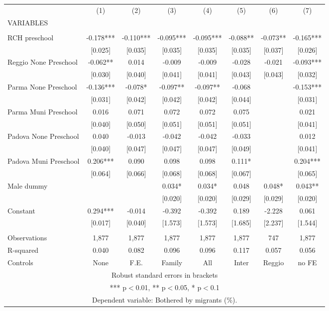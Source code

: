 \begin{tabular}{lccccccc} \hline
 & (1) & (2) & (3) & (4) & (5) & (6) & (7) \\
VARIABLES &  &  &  &  &  &  &  \\ \hline
 &  &  &  &  &  &  &  \\
RCH preschool & -0.178*** & -0.110*** & -0.095*** & -0.095*** & -0.088** & -0.073** & -0.165*** \\
 & [0.025] & [0.035] & [0.035] & [0.035] & [0.035] & [0.037] & [0.026] \\
Reggio None Preschool & -0.062** & 0.014 & -0.009 & -0.009 & -0.028 & -0.021 & -0.093*** \\
 & [0.030] & [0.040] & [0.041] & [0.041] & [0.043] & [0.043] & [0.032] \\
Parma None Preschool & -0.136*** & -0.078* & -0.097** & -0.097** & -0.068 &  & -0.153*** \\
 & [0.031] & [0.042] & [0.042] & [0.042] & [0.044] &  & [0.031] \\
Parma Muni Preschool & 0.016 & 0.071 & 0.072 & 0.072 & 0.075 &  & 0.021 \\
 & [0.040] & [0.050] & [0.051] & [0.051] & [0.051] &  & [0.041] \\
Padova None Preschool & 0.040 & -0.013 & -0.042 & -0.042 & -0.033 &  & 0.012 \\
 & [0.040] & [0.047] & [0.047] & [0.047] & [0.049] &  & [0.041] \\
Padova Muni Preschool & 0.206*** & 0.090 & 0.098 & 0.098 & 0.111* &  & 0.204*** \\
 & [0.064] & [0.066] & [0.068] & [0.068] & [0.067] &  & [0.065] \\
Male dummy &  &  & 0.034* & 0.034* & 0.048 & 0.048* & 0.043** \\
 &  &  & [0.020] & [0.020] & [0.029] & [0.029] & [0.020] \\
Constant & 0.294*** & -0.014 & -0.392 & -0.392 & 0.189 & -2.228 & 0.061 \\
 & [0.017] & [0.040] & [1.573] & [1.573] & [1.685] & [2.237] & [1.544] \\
 &  &  &  &  &  &  &  \\
Observations & 1,877 & 1,877 & 1,877 & 1,877 & 1,877 & 747 & 1,877 \\
R-squared & 0.040 & 0.082 & 0.096 & 0.096 & 0.117 & 0.057 & 0.056 \\
 Controls & None & F.E. & Family & All & Inter & Reggio & no FE \\ \hline
\multicolumn{8}{c}{ Robust standard errors in brackets} \\
\multicolumn{8}{c}{ *** p$<$0.01, ** p$<$0.05, * p$<$0.1} \\
\multicolumn{8}{c}{ Dependent variable: Bothered by migrants (\%).} \\
\end{tabular}
